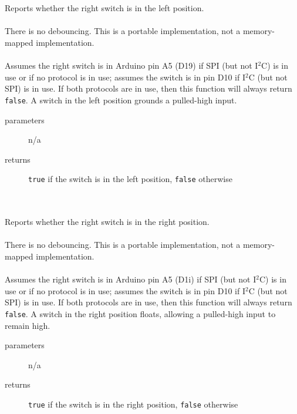 \begin{itemize}
         \\ \\
        Reports whether the right switch is in the left position. \\ \\
        There is no debouncing.
        This is a portable implementation, not a memory-mapped implementation. \\ \\
        Assumes the right switch is in Arduino pin A5 (D19) if SPI (but not I$^2$C) is in use or if no protocol is in use;
        assumes the switch is in pin D10 if I$^2$C (but not SPI) is in use.
        If both protocols are in use, then this function will always return \lstinline{false}.
        A switch in the left position grounds a pulled-high input.
        \begin{description}
            \item[parameters] n/a
            \item[returns] \lstinline{true} if the switch is in the left position, \lstinline{false} otherwise
        \end{description}

         \\ \\
        Reports whether the right switch is in the right position. \\ \\
        There is no debouncing.
        This is a portable implementation, not a memory-mapped implementation. \\ \\
        Assumes the right switch is in Arduino pin A5 (D1i) if SPI (but not I$^2$C) is in use or if no protocol is in use;
        assumes the switch is in pin D10 if I$^2$C (but not SPI) is in use.
        If both protocols are in use, then this function will always return \lstinline{false}.
        A switch in the right position floats, allowing a pulled-high input to remain high.
        \begin{description}
            \item[parameters] n/a
            \item[returns] \lstinline{true} if the switch is in the right position, \lstinline{false} otherwise
        \end{description}

    \end{itemize}


